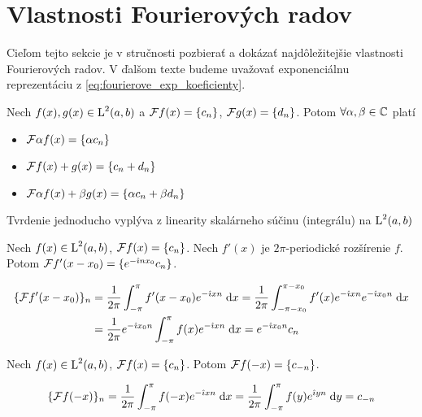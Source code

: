 \section{Vlastnosti Fourierových radov}
Cieľom tejto sekcie je v stručnosti pozbierať a dokázať
najdôležitejšie vlastnosti Fourierových radov. V ďalšom texte budeme
uvažovať exponenciálnu reprezentáciu z \ref{eq:fourierove_exp_koeficienty}.

\begin{veta}[Linearita]
Nech $f(x), g(x) \in \mbox{L}^2(a,b)$ a $\mathcal{F}{f(x)} = \{c_n\}$,
$\mathcal{F}{g(x)} = \{d_n\}$.
Potom $\forall \alpha,\beta \in \mathbb{C}$ platí
\begin{itemize}
    \item $\mathcal{F}{\alpha f(x)} = \{\alpha c_n\}$
    \item $\mathcal{F}{f(x) + g(x)} = \{c_n + d_n\}$
    \item $\mathcal{F}{\alpha f(x) + \beta g(x)} = \{\alpha c_n + \beta
    d_n\}$
\end{itemize}
\end{veta}
\begin{dokaz}
 Tvrdenie jednoducho vyplýva z linearity skalárneho súčinu
 (integrálu) na $\mbox{L}^2(a,b)$
\end{dokaz}

\begin{veta}
Nech $f(x) \in \mbox{L}^2(a,b)$, $\mathcal{F}{f(x)} = \{c_n\}$.
Nech $f'(x)$ je $2\pi$-periodické rozšírenie $f$. Potom
$\mathcal{F}{f'(x-x_0)} = \{ e^{-\hat{\imath} n x_0} c_n \}$.
\label{veta:time_shift}
\end{veta}
\begin{dokaz}
    \begin{equation*}
    \begin{split}
      \{\mathcal{F} f'(x-x_0)\}_n &= 
        \frac{1}{2\pi} \int_{-\pi}^{\pi} f'(x-x_0) e^{-\hat{\imath} x n} \; \mathrm{d} x 
        = \frac{1}{2\pi} \int_{-\pi - x_0}^{\pi - x_0} f'(x) e^{-\hat{\imath} x
            n} e^{-\hat{\imath} x_0 n} \; \mathrm{d} x \\
        &= \frac{1}{2\pi} e^{-\hat{\imath} x_0 n} \int_{-\pi}^{\pi} f(x) e^{-\hat{\imath} x n} \; \mathrm{d} x
         = e^{-\hat{\imath} x_0 n} c_n
    \end{split}
    \end{equation*}
\end{dokaz}

\begin{veta}
Nech $f(x) \in \mbox{L}^2(a,b)$, $\mathcal{F}{f(x)} = \{c_n\}$. Potom
$\mathcal{F}{f(-x)} = \{c_{-n} \}$.
\label{veta:time_reverse}
\end{veta}
\begin{dokaz}
    \begin{equation*}
      \{\mathcal{F} f(-x)\}_n
        = \frac{1}{2\pi} \int_{-\pi}^{\pi} f(-x) e^{-\hat{\imath} x n} \; \mathrm{d} x 
        = \frac{1}{2\pi} \int_{-\pi}^{\pi} f(y) e^{\hat{\imath} y n} \; \mathrm{d} y
        = c_{-n}
    \end{equation*}
\end{dokaz}

